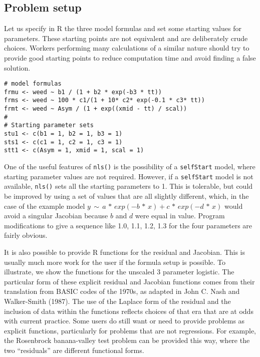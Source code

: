 \hypertarget{problem-setup}{%
\subsection{Problem setup}\label{problem-setup}}

Let us specify in R the three model formulas and set some starting
values for parameters. These starting points are not equivalent and
are deliberately crude choices. Workers performing many calculations
of a similar nature should try to provide good starting points to reduce
computation time and avoid finding a false solution.

\begin{verbatim}
# model formulas
frmu <- weed ~ b1 / (1 + b2 * exp(-b3 * tt))
frms <- weed ~ 100 * c1/(1 + 10* c2* exp(-0.1 * c3* tt))
frmt <- weed ~ Asym / (1 + exp((xmid - tt) / scal))
#
# Starting parameter sets
stu1 <- c(b1 = 1, b2 = 1, b3 = 1)
sts1 <- c(c1 = 1, c2 = 1, c3 = 1)
stt1 <- c(Asym = 1, xmid = 1, scal = 1)
\end{verbatim}

One of the useful features of \texttt{nls()} is the possibility of a \texttt{selfStart} model,
where starting parameter values are not required. However, if a \texttt{selfStart} model
is not available, \texttt{nls()} sets all the starting parameters
to 1. This is tolerable, but could be improved by using a set of values
that are all slightly different, which, in the case of the example
model \(y \,\sim\, a \,*\, exp(-b \,*\, x) + c\,*\,exp(-d \,*\, x)\)
would avoid a singular Jacobian because \(b\) and \(d\) were equal in value.
Program modifications to give a sequence like 1.0, 1.1, 1.2, 1.3 for the four
parameters are fairly obvious.

It is also possible to provide R functions for the residual and Jacobian.
This is usually much more work for the user if the formula setup is possible.
To illustrate, we show the functions for the unscaled 3 parameter logistic.
The particular form of these explicit residual and Jacobian functions comes from
their translation from BASIC codes of the 1970s, as adapted in John C. Nash and Walker-Smith (1987). The use
of the Laplace form of the residual and the inclusion of data within the functions
reflects choices of that era that are at odds with current practice. Some users
do still want or need to provide problems as explicit functions, particularly
for problems that are not regressions. For example, the Rosenbrock banana-valley
test problem can be provided this way, where the two ``residuals'' are different
functional forms.

